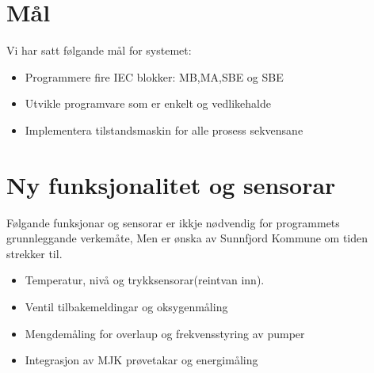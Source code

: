 \newpage
\section{Mål}
Vi har satt følgande mål for systemet:

\begin{itemize}
    \item Programmere fire \gls{IEC} blokker: MB,MA,SBE og SBE
    \item Utvikle programvare som er enkelt og vedlikehalde
    \item Implementera tilstandsmaskin for alle prosess sekvensane
\end{itemize}

\section{Ny funksjonalitet og sensorar}
Følgande funksjonar og sensorar er ikkje nødvendig for programmets grunnleggande verkemåte, Men 
er ønska av \gls{Sunnfjord Kommune} om tiden strekker til.  
\begin{itemize}
    \item Temperatur, nivå og trykksensorar(reintvan inn).
    \item Ventil tilbakemeldingar og oksygenmåling
    \item Mengdemåling for overlaup og frekvensstyring av pumper
    \item Integrasjon av MJK prøvetakar og energimåling
\end{itemize}

